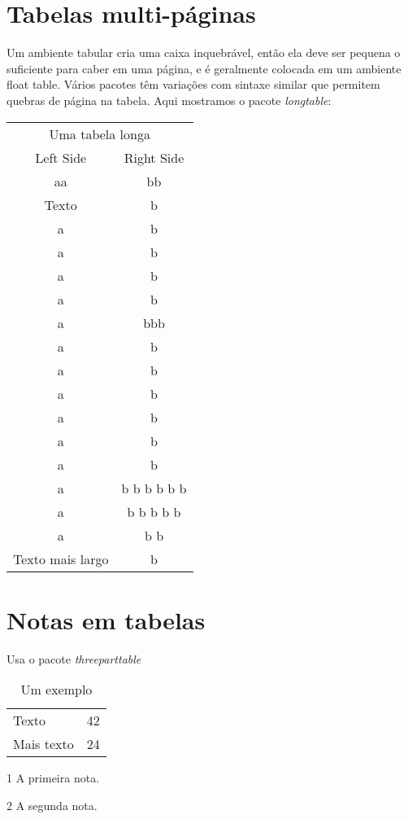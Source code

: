 \documentclass[brazilian, 12pt]{article}
\begin{document}
\vspace{10pt}

\section{Tabelas multi-páginas}

Um ambiente tabular cria uma caixa inquebrável, então ela deve ser pequena o suficiente para caber em uma página, e é geralmente colocada em um ambiente float table. Vários pacotes têm variações com sintaxe similar que permitem quebras de página na tabela. Aqui mostramos o pacote \emph{longtable}: \\

\vspace{20pt}

\begin{longtable}{cc}
\multicolumn{2}{c}{Uma tabela longa} \\
Left Side & Right Side \\
\hline
\endhead
\hline
\endfoot
aa & bb\\  
Texto & b\\  
a & b\\  
a & b\\  
a & b\\  
a & b\\  
a & bbb\\  
a & b\\  
a & b\\  
a & b\\  
a & b\\  
a & b\\  
a & b\\  
a & b b b b b b\\  
a & b b b b b\\  
a & b b\\  
Texto mais largo & b\\
\end{longtable}

\vspace{10pt}

\section{Notas em tabelas}

Usa o pacote \emph{threeparttable} \\

\begin{table}[h]
\begin{threeparttable}
    \caption{Um exemplo}
    \begin{tabular}{ll}
        \hline
        Texto & 42\tnote{1}\\
        Mais texto & 24\tnote{2}\\
        \hline
    \end{tabular}
    \begin{tablenotes}
        \item [1] A primeira nota.
        \item [2] A segunda nota.
    \end{tablenotes}
\end{threeparttable}
\end{table}
\end{document}
